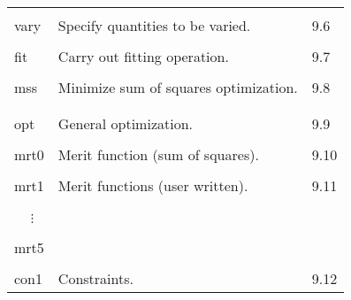 \begin{center}
\begin{tabular}{lll}
\vspace{-3mm}& &\\
\hspace{1.5em}vary   &     Specify quantities to be varied.     &   \hspace{2em}9.6\\
\vspace{-3mm}& &\\
\hspace{1.5em}fit    &     Carry out fitting operation.         &   \hspace{2em}9.7\\
\vspace{-3mm}& &\\
\hspace{1.5em}mss    &   Minimize sum of squares optimization. &   \hspace{2em}9.8\\\vspace{-3mm}& &\\
\vspace{-3mm}& &\\
\hspace{1.5em}opt    &     General optimization.              &    \hspace{2em}9.9\\
\vspace{-3mm}& &\\
\hspace{1.5em}mrt0   &     Merit function (sum of squares).   &    \hspace{2em}9.10\\
\vspace{-3mm}& &\\
\hspace{1.5em}mrt1    &    Merit functions (user written).   &     \hspace{2em}9.11\\
\vspace{-7mm}& &\\
\hspace{1.5em}\ \ \,$\vdots$ & &\\
\vspace{-7mm}& &\\
\hspace{1.5em}mrt5 & & \\
\vspace{-3mm}& &\\
\hspace{1.5em}con1   &     Constraints.                          &  \hspace{2em}9.12\\

\end{tabular}
\end{center}
